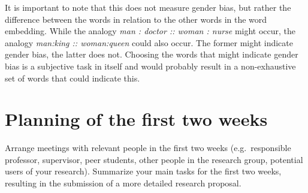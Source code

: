 \documentclass[english, a4paper, 10pt]{article}
\begin{document}
It is important to note that this does not measure gender bias, but rather the difference between the words in relation to the other words in the word embedding.
While the analogy \textit{man : doctor :: woman : nurse} might occur, the analogy \textit{man:king :: woman:queen} could also occur.
The former might indicate gender bias, the latter does not.
Choosing the words that might indicate gender bias is a subjective task in itself and would probably result in a non-exhaustive set of words that could indicate this.

\section*{Planning of the first two weeks}
Arrange meetings with relevant people in the first two weeks (e.g.\ responsible professor, supervisor, peer students, other people in the research group, potential users of your research).
Summarize your main tasks for the first two weeks, resulting in the submission of a more detailed research proposal.

\printbibliography
\end{document}
